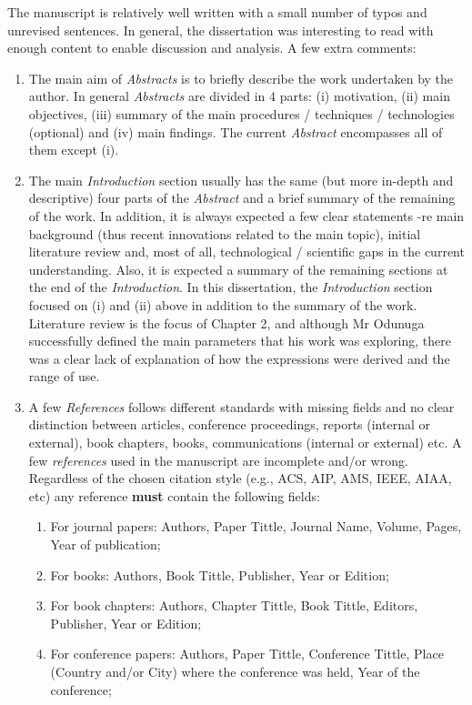\documentclass[14pt,twoside]{report}
\begin{document}
The manuscript is relatively well written with a small number of typos and unrevised sentences. In general, the dissertation was interesting to read with enough content to enable discussion and analysis. A few extra comments:
\begin{enumerate}
\item The main aim of {\it Abstracts} is to briefly describe the work undertaken by the author. In general {\it Abstracts} are divided in 4 parts: (i) motivation, (ii) main objectives, (iii) summary of the main procedures / techniques / technologies (optional) and (iv) main findings. The current {\it Abstract} encompasses all of them except (i).
%
\item The main {\it Introduction} section usually has the same (but more in-depth and descriptive) four parts of the {\it Abstract} and a brief summary of the remaining of the work. In addition, it is always expected a few clear statements -re main background (thus recent innovations related to the main topic), initial literature review and, most of all, technological / scientific gaps in the current understanding. Also, it is expected a summary of the remaining sections at the end of the {\it Introduction}. In this dissertation, the {\it Introduction} section focused on (i) and (ii) above in addition to the summary of the work. Literature review is the focus of Chapter 2, and although Mr Odunuga successfully defined the main parameters that his work was exploring, there was a clear lack of explanation of how the expressions were derived and the range of use.
%
\item A few {\it References} follows different standards with missing fields and no clear distinction between articles, conference proceedings, reports (internal or external), book chapters, books, communications (internal or external) etc.  A few {\it references} used in the manuscript are incomplete and/or wrong. Regardless of the chosen citation style (e.g., ACS, AIP, AMS, IEEE, AIAA, etc) any reference {\bf must} contain the following fields: 
\begin{enumerate}
\item For journal papers: Authors, Paper Tittle, Journal Name, Volume, Pages, Year of publication;
\item For books: Authors, Book Tittle, Publisher, Year or Edition;
\item For book chapters: Authors, Chapter Tittle, Book Tittle, Editors, Publisher, Year or Edition;
\item For conference papers: Authors, Paper Tittle, Conference Tittle, Place (Country and/or City) where the conference was held, Year of the conference;

\end{enumerate}
\end{enumerate}
\end{document}
